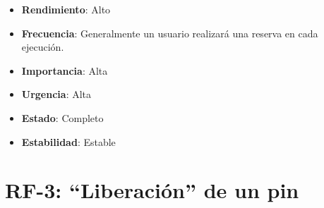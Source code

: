 \documentclass[letterpaper,10pt,spanish]{sphinxmanual}
\begin{document}
\begin{itemize}
\item {} 
\textbf{Rendimiento}: Alto

\item {} 
\textbf{Frecuencia}: Generalmente un usuario realizará una reserva en cada ejecución.

\item {} 
\textbf{Importancia}: Alta

\item {} 
\textbf{Urgencia}: Alta

\item {} 
\textbf{Estado}: Completo

\item {} 
\textbf{Estabilidad}: Estable

\end{itemize}


\section{RF-3: ``Liberación'' de un pin}
\end{document}
